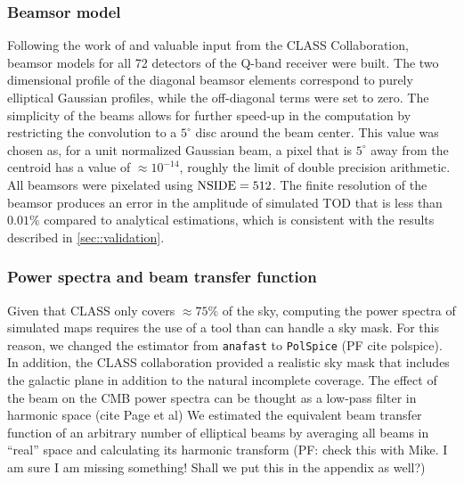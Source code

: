 \documentclass[a4paper,11pt]{article}
\begin{document}
\subsubsection{Beamsor model}

Following the work of \cite{2012SPIE.8452E..20E} and valuable input from the CLASS Collaboration, beamsor models for all 72 detectors of the Q-band receiver were built. The two dimensional profile of the diagonal beamsor elements correspond to purely elliptical Gaussian profiles, while the off-diagonal terms were set to zero. The simplicity of the beams allows for further speed-up in the computation by restricting the convolution to a $5^\circ$ disc around the beam center. This value was chosen as, for a unit normalized Gaussian beam, a pixel that is $5^\circ$ away from the centroid has a value of $\approx 10^{-14}$, roughly the limit of double precision arithmetic. All beamsors were pixelated using $\rm{NSIDE}=512$. The finite resolution of the beamsor produces an error in the amplitude of simulated TOD that is less than $0.01\%$ compared to analytical estimations, which is consistent with the results described in \ref{sec::validation}.


\subsubsection{Power spectra and beam transfer function}

Given that CLASS only covers $\approx 75\%$ of the sky, computing the power spectra of simulated maps requires the use of a tool than can handle a sky mask. For this reason, we changed the estimator from \texttt{anafast} to \texttt{PolSpice} (PF cite polspice). In addition, the CLASS collaboration provided a realistic sky mask that includes the galactic plane in addition to the natural incomplete coverage. The effect of the beam on the CMB power spectra can be thought as a low-pass filter in harmonic space (cite Page et al) We estimated the equivalent beam transfer function of an arbitrary number of elliptical beams by averaging all beams in ``real'' space and calculating its harmonic transform (PF: check this with Mike. I am sure I am missing something! Shall we put this in the appendix as well?)
\end{document}

